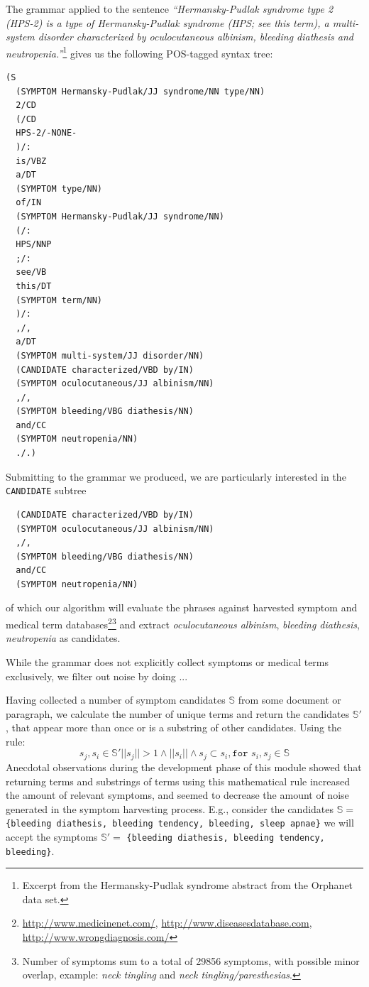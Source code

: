 \documentclass[10pt,letterpaper,final]{article}
\begin{document}
The grammar applied to the sentence \textit{``Hermansky-Pudlak syndrome
type 2 (HPS-2) is a type of Hermansky-Pudlak syndrome (HPS; see this
term), a multi-system disorder characterized by oculocutaneous albinism,
bleeding diathesis and neutropenia.''}\footnote{Excerpt from the
Hermansky-Pudlak syndrome abstract from the Orphanet data set.} gives us
the following POS-tagged syntax tree:
\begin{lstlisting}
(S
  (SYMPTOM Hermansky-Pudlak/JJ syndrome/NN type/NN)
  2/CD
  (/CD
  HPS-2/-NONE-
  )/:
  is/VBZ
  a/DT
  (SYMPTOM type/NN)
  of/IN
  (SYMPTOM Hermansky-Pudlak/JJ syndrome/NN)
  (/:
  HPS/NNP
  ;/:
  see/VB
  this/DT
  (SYMPTOM term/NN)
  )/:
  ,/,
  a/DT
  (SYMPTOM multi-system/JJ disorder/NN)
  (CANDIDATE characterized/VBD by/IN)
  (SYMPTOM oculocutaneous/JJ albinism/NN)
  ,/,
  (SYMPTOM bleeding/VBG diathesis/NN)
  and/CC
  (SYMPTOM neutropenia/NN)
  ./.)
\end{lstlisting}
Submitting to the grammar we produced, we are particularly interested in
the \texttt{CANDIDATE} subtree
\begin{lstlisting}
  (CANDIDATE characterized/VBD by/IN)
  (SYMPTOM oculocutaneous/JJ albinism/NN)
  ,/,
  (SYMPTOM bleeding/VBG diathesis/NN)
  and/CC
  (SYMPTOM neutropenia/NN)
\end{lstlisting}
of which our algorithm will evaluate the phrases against harvested
symptom and medical term
databases\footnote{\url{http://www.medicinenet.com/},
\url{http://www.diseasesdatabase.com},
\url{http://www.wrongdiagnosis.com/}}\footnote{Number of symptoms sum to
a total of 29856 symptoms, with possible minor overlap, example:
\textit{neck tingling} and \textit{neck tingling/paresthesias}.} and extract
\textit{oculocutaneous albinism}, \textit{bleeding diathesis},
\textit{neutropenia} as candidates.

While the grammar does not explicitly collect symptoms or medical terms
exclusively, we filter out noise by doing ...


Having collected a number of symptom candidates $\mathbb{S}$ from some
document or paragraph, we calculate the number of unique terms and return
the candidates $\mathbb{S'}$, that appear more than once or is a
substring of other candidates.  Using the rule:
\begin{equation}
 s_{j}, s_{i} \in \mathbb{S'} ||s_{j}|| > 1 \wedge||s_{i}|| \wedge s_{j} \subset s_{i}, \texttt{for } s_{i}, s_{j} \in \mathbb{S}
\end{equation}
Anecdotal observations during the development phase of this module
showed that returning terms and substrings of terms using this
mathematical rule increased the amount of relevant symptoms, and seemed
to decrease the amount of noise generated in the symptom harvesting
process. E.g., consider the candidates $\mathbb{S} = $
\texttt{\{bleeding diathesis, bleeding tendency, bleeding, sleep
apnae\}} we will accept the symptoms $\mathbb{S'} = $ \texttt{\{bleeding
diathesis, bleeding tendency, bleeding\}}.
\end{document}

